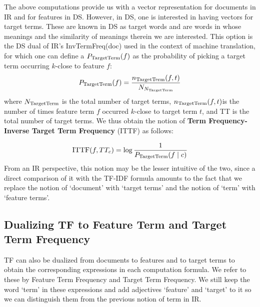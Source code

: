 \medskip
The above computations provide us with a vector representation for documents in IR and for features in DS. However, in DS, one is interested in having vectors for target terms. These are known in DS as target words and  are words in whose meanings and the similarity of meanings therein we are interested.  This  option is the DS dual of IR's  InvTermFreq(doc) used in the context of machine translation, for which one can define a $P_{\textmd{TargetTerm}}(f) $ as the  probability of picking a target term  occurring $k$-close to feature $f$: 
\[
P_{\textmd{TargetTerm}}(f) = \frac{n_{\textmd{TargetTerm}}(f, t)}{N_{N_{\textmd{TargetTerm}}}}
\]
where  $N_{\textmd{TargetTerm}}$ is the total number of target terms,    $n_{\textmd{TargetTerm}}(f, t)$is the number of  times feature term $f$ occurred   $k$-close to target term  $t$,  and TT is the total number of target terms. We thus obtain the notion of  {\bf Term Frequency-Inverse Target Term Frequency} (ITTF) as follows:

\begin{equation}
\label{ittf}
 \textmd{ITTF}(f, TT_c) =  \log{\frac{1}{P_{\textmd{TargetTerm}}(f \mid c)}}
\end{equation}
From an IR perspective, this notion may be  the  lesser intuitive of the two, since a direct comparison of it  with the TF-IDF formula amounts to the fact that  we replace the notion of `document' with `target terms' and the notion of `term' with `feature terms'.

\subsection{Dualizing TF to Feature Term and Target Term Frequency}
\label{subsec-TF}

TF can also be dualized from documents to features and to target terms to obtain the corresponding expressions in each computation formula.  We refer to these by Feature Term Frequency and Target Term  Frequency. We still keep the  word `term'  in these expressions and add adjectives `feature' and `target'  to it so we can distinguish them from the previous notion of term in IR. 

